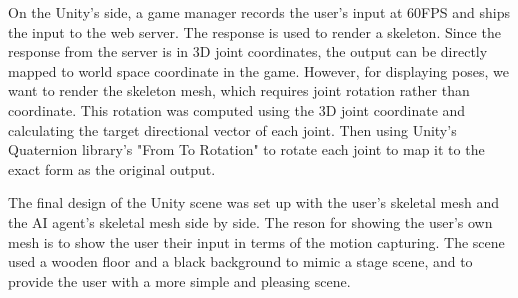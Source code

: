 \documentclass[final,5p,times,authoryear]{article}
\begin{document}
On the Unity's side, a game manager records the user's input at 60FPS and ships the input to the web server. The response is used to render a skeleton. Since the response from the server is in 3D joint coordinates, the output can be directly mapped to world space coordinate in the game. However, for displaying poses, we want to render the skeleton mesh, which requires joint rotation rather than coordinate. This rotation was computed using the 3D joint coordinate and calculating the target directional vector of each joint. Then using Unity's Quaternion library's "From To Rotation" to rotate each joint to map it to the exact form as the original output.

The final design of the Unity scene was set up with the user's skeletal mesh and the AI agent's skeletal mesh side by side. The reson for showing the user's own mesh is to show the user their input in terms of the motion capturing. The scene used a wooden floor and a black background to mimic a stage scene, and to provide the user with a more simple and pleasing scene.

\section{}
\end{document}
